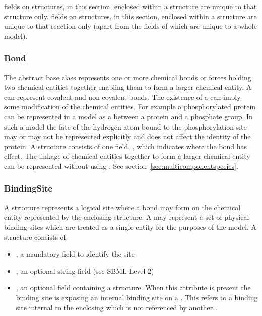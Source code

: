 \documentclass{cekarticle}
\begin{document}
 fields on structures, in this section, enclosed within
a  structure are unique to that structure only.
 fields on structures, in this section, enclosed within
a  structure are unique to that reaction only
(apart from the  fields of
 which are unique to a whole
model).

\subsubsection{Bond}

The abstract base class  represents one or more
chemical bonds or forces holding two chemical entities together
enabling them to form a larger chemical entity.  A 
can represent covalent and non-covalent bonds.  The existence of a
 can imply some modification of the chemical entities.
For example a phosphorylated protein can be represented in a model
as a  between a protein and a phosphate group.  In
such a model the fate of the hydrogen atom bound to the
phosphorylation site may or may not be represented explicitly and
does not affect the identity of the protein. A 
structure consists of one  field,
, which indicates where the bond has effect.
The linkage of chemical entities together to form a larger
chemical entity can be represented without using .
See section~\ref{sec:multicomponentspecies}.

\subsubsection{BindingSite}

A  structure represents a logical site where a
bond may form on the chemical entity represented by the enclosing
 structure. A  may represent
a set of physical binding sites which are treated as a single
entity for the purposes of the model. A 
structure consists of

\begin{itemize}

\item {}, a mandatory  field to identify the site

\item {}, an optional string field (see SBML Level 2)

\item {}, an optional field containing
a  structure.  When this attribute is
present the binding site is exposing an internal binding site on a
. This 
refers to a binding site internal to the enclosing
 which is not referenced by another
.

\end{itemize}
\end{document}
